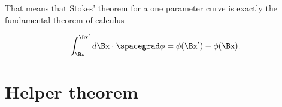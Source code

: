 That means that Stokes' theorem for a one parameter curve is exactly the fundamental theorem of calculus

\begin{dmath}\label{eqn:stokesTheoremCore:80}
\int_{\Bx}^{\Bx'} d\Bx \cdot \spacegrad \phi = \phi(\Bx') - \phi(\Bx).
\end{dmath}

\section{Helper theorem}


